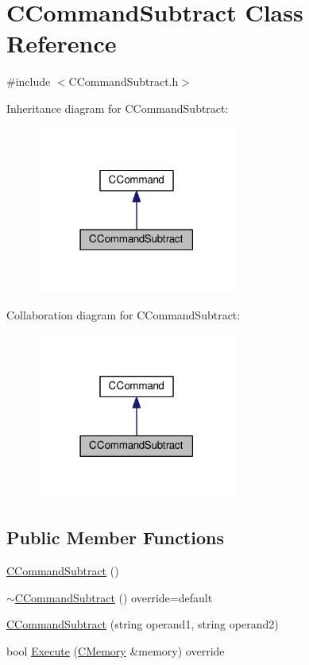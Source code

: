 \hypertarget{classCCommandSubtract}{}\section{C\+Command\+Subtract Class Reference}
\label{classCCommandSubtract}


{\ttfamily \#include $<$C\+Command\+Subtract.\+h$>$}



Inheritance diagram for C\+Command\+Subtract\+:\nopagebreak
\begin{figure}[H]
\begin{center}
\leavevmode
\includegraphics[width=186pt]{classCCommandSubtract__inherit__graph}
\end{center}
\end{figure}


Collaboration diagram for C\+Command\+Subtract\+:\nopagebreak
\begin{figure}[H]
\begin{center}
\leavevmode
\includegraphics[width=186pt]{classCCommandSubtract__coll__graph}
\end{center}
\end{figure}
\subsection*{Public Member Functions}
\begin{DoxyCompactItemize}
\item 
\hyperlink{classCCommandSubtract_a658496963167ac339c899846fbe121aa}{C\+Command\+Subtract} ()
\item 
\hyperlink{classCCommandSubtract_afd8f13ca6aa8a5c2c06e9ef5ed726e05}{$\sim$\+C\+Command\+Subtract} () override=default
\item 
\hyperlink{classCCommandSubtract_ac89615cd1201b239e7bcaf37f50cc79c}{C\+Command\+Subtract} (string operand1, string operand2)
\item 
bool \hyperlink{classCCommandSubtract_ade3f2032aab4edce747d251e89a6398b}{Execute} (\hyperlink{classCMemory}{C\+Memory} \&memory) override
\end{DoxyCompactItemize}
